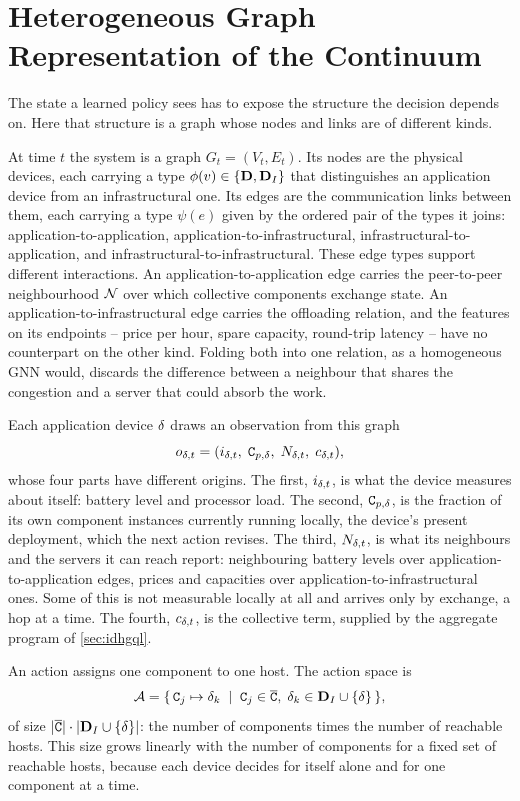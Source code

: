 \section{Heterogeneous Graph Representation of the Continuum}
\label{sec:hetero-graph-state}

The state a learned policy sees has to expose the structure the decision depends on.
%
Here that structure is a graph whose nodes and links are of different kinds.

At time $t$ the system is a graph $G_t = (V_t, E_t)$.
%
Its nodes are the physical devices,
each carrying a type $\phi(v) \in \{\mathbf{D}, \mathbf{D}_{I}\}$ that distinguishes an application device from an infrastructural one.
%
Its edges are the communication links between them,
each carrying a type $\psi(e)$ given by the ordered pair of the types it joins:
application-to-application,
application-to-infrastructural,
infrastructural-to-application,
and infrastructural-to-infrastructural.
%
These edge types support different interactions.
%
An application-to-application edge carries the peer-to-peer neighbourhood $\mathcal{N}$ over which collective components exchange state.
%
An application-to-infrastructural edge carries the offloading relation,
and the features on its endpoints -- price per hour, spare capacity, round-trip latency -- have no counterpart on the other kind.
%
Folding both into one relation, as a homogeneous \ac{GNN} would,
discards the difference between a neighbour that shares the congestion and a server that could absorb the work.

Each application device $\delta$ draws an observation from this graph
\[
    o_{\delta,t} = (i_{\delta,t},\; \mathtt{C}_{p,\delta},\; N_{\delta,t},\; c_{\delta,t}),
\]
whose four parts have different origins.
%
The first, $i_{\delta,t}$, is what the device measures about itself: battery level and processor load.
%
The second, $\mathtt{C}_{p,\delta}$, is the fraction of its own component instances currently running locally,
the device's present deployment, which the next action revises.
%
The third, $N_{\delta,t}$, is what its neighbours and the servers it can reach report:
neighbouring battery levels over application-to-application edges,
prices and capacities over application-to-infrastructural ones.
%
Some of this is not measurable locally at all and arrives only by exchange, a hop at a time.
%
The fourth, $c_{\delta,t}$, is the collective term, supplied by the aggregate program of \cref{sec:idhgql}.

An action assigns one component to one host.
%
The action space is
\[
    \mathcal{A} = \{\, \mathtt{C}_j \mapsto \delta_k \;\mid\; \mathtt{C}_j \in \overline{\mathtt{C}},\; \delta_k \in \mathbf{D}_{I} \cup \{\delta\} \,\},
\]
of size $|\overline{\mathtt{C}}| \cdot |\mathbf{D}_{I} \cup \{\delta\}|$:
the number of components times the number of reachable hosts.
%
This size grows linearly with the number of components for a fixed set of reachable hosts,
because each device decides for itself alone and for one component at a time.

